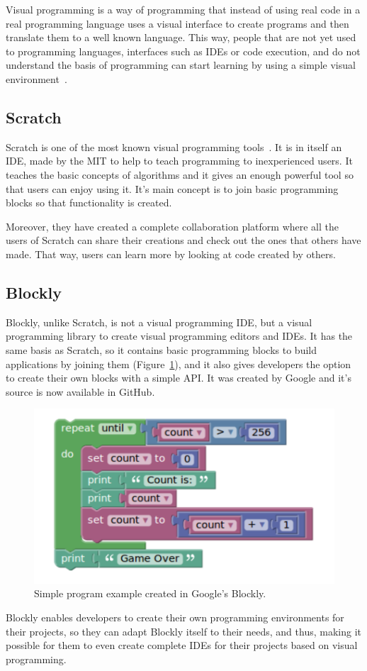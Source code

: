 Visual programming is a way of programming that instead of using real code in a real programming
language uses a visual interface to create programs and then translate them to a well known
language. This way, people that are not yet used to programming languages, interfaces such as IDEs
or code execution, and do not understand the basis of programming can start learning by using a
simple visual environment~\cite{visual_programming}.

\subsection{Scratch}

Scratch is one of the most known visual programming tools~\cite{scratch}. It is in itself an IDE,
made by the MIT to help to teach programming to inexperienced users. It teaches the basic concepts
of algorithms and it gives an enough powerful tool so that users can enjoy using it. It's main
concept is to join basic programming blocks so that functionality is created.

Moreover, they have created a complete collaboration platform where all the users of Scratch can
share their creations and check out the ones that others have made. That way, users can learn more
by looking at code created by others.

\subsection{Blockly}

Blockly, unlike Scratch, is not a visual programming IDE, but a visual programming library to create
visual programming editors and IDEs. It has the same basis as Scratch, so it contains basic
programming blocks to build applications by joining them (Figure~\ref{fig:blockly}), and it also
gives developers the option to create their own blocks with a simple API. It was created by Google
and it's source is now available in GitHub.

\begin{figure}[!htbp]
	\centering
	\includegraphics[width=.5\textwidth]{fig/blockly}
	\caption{Simple program example created in Google's Blockly.}\label{fig:blockly}
\end{figure}

Blockly enables developers to create their own programming environments for their projects, so they
can adapt Blockly itself to their needs, and thus, making it possible for them to even create
complete IDEs for their projects based on visual programming.


